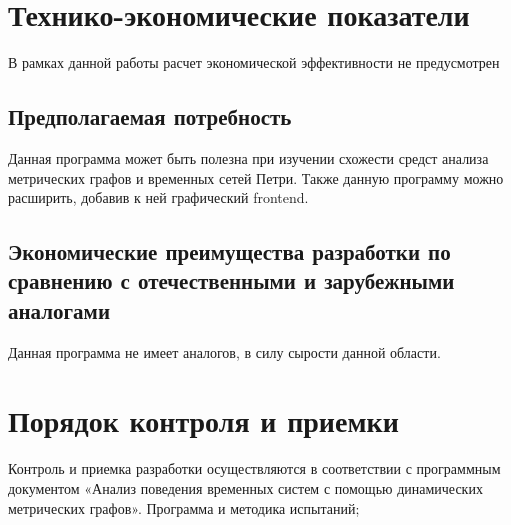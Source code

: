 \documentclass{../TechDoc}
\begin{document}
	\section{Технико-экономические показатели}
	В рамках данной работы расчет экономической эффективности не предусмотрен
	\subsection{Предполагаемая потребность}
	Данная программа может быть полезна при изучении схожести средст анализа метрических графов и временных сетей Петри. Также данную программу можно расширить, добавив к ней графический frontend. 
	
	\subsection{Экономические преимущества разработки по сравнению с отечественными и зарубежными аналогами}
	Данная программа не имеет аналогов, в силу сырости данной области.
	
	\section{Порядок контроля и приемки}
	Контроль и приемка разработки осуществляются в соответствии с программным документом «Анализ поведения временных систем с помощью динамических метрических графов». Программа и методика испытаний\cite{TESTbook};
	
	\newpage
	\addtocounter{section}{2}
	
	 \registrationList
\end{document}
